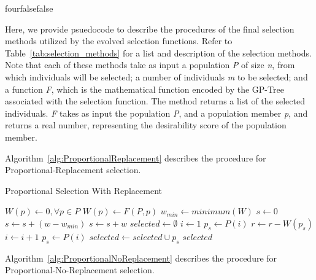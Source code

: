 \documentclass[times,12pt,titlepage]{mstogs}
\begin{document}

\begin{ThesisAppendix}{four}{false}{false}


\label{apx:SelectionPsuedocode}

Here, we provide psuedocode to describe the procedures of the final selection methods utilized by the evolved selection functions. Refer to Table~\ref{tab:selection_methods} for a list and description of the selection methods. Note that each of these methods take as input a population \textit{P} of size \textit{n}, from which individuals will be selected; a number of individuals \textit{m} to be selected; and a function \textit{F}, which is the mathematical function encoded by the GP-Tree associated with the selection function. The method returns a list of the selected individuals. \textit{F} takes as input the population \textit{P}, and a population member \textit{p}, and returns a real number, representing the desirability score of the population member.

Algorithm~\ref{alg:ProportionalReplacement} describes the procedure for Proportional-Replacement selection.

\begin{algorithm}
\caption{Proportional Selection With Replacement}
\label{alg:ProportionalReplacement}
\begin{algorithmic}[1]
 \label{proc:ProportionalReplacement}
	\State $W(p) \leftarrow 0,\forall p \in P$
		\State $W(p) \leftarrow F(P,p)$
	\EndFor
	\State $w_{min} \leftarrow minimum(W)$	
	\State $s \leftarrow 0$
			\State $s \leftarrow s + (w - w_{min} )$			
		\Else
			\State $s \leftarrow s + w$		
		\EndIf	
	\EndFor
	\State $selected \leftarrow \emptyset$
		\State $i \leftarrow 1$
		\State $p_s \leftarrow P(i)$
			\State $r \leftarrow r - W(p_s)$
			\State $i \leftarrow i + 1$
			\State $p_s \leftarrow P(i)$
		\EndWhile	
		\State $selected \leftarrow selected \cup p_s$
	\EndFor
	\State \Return $selected$
\EndFunction
\end{algorithmic}
\end{algorithm}

Algorithm~\ref{alg:ProportionalNoReplacement} describes the procedure for Proportional-No-Replacement selection.


\end{ThesisAppendix}
\end{document}
